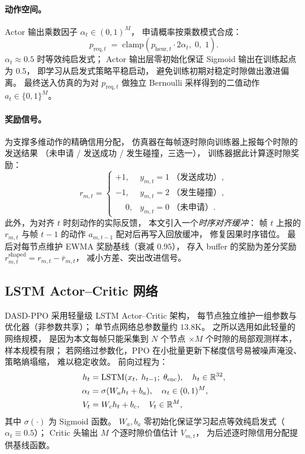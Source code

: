 \paragraph{动作空间。}
Actor 输出乘数因子 \(\alpha_t\in(0,1)^M\)，
申请概率按乘数模式合成：
\begin{equation}
p_{\mathrm{req},t} \;=\; \mathrm{clamp}\!\left( p_{\mathrm{heur},t}\cdot 2\alpha_t,\;0,\;1\right).
\label{eq:multiplier}
\end{equation}
\(\alpha_t\approx 0.5\) 时等效纯启发式；
Actor 输出层零初始化保证 Sigmoid 输出在训练起点为 \(0.5\)，
即学习从启发式策略平稳启动，
避免训练初期对稳定时隙做出激进偏离。
最终送入仿真的为对 \(p_{\mathrm{req},t}\) 做独立 Bernoulli 采样得到的二值动作 \(a_t\in\{0,1\}^M\)。

\paragraph{奖励信号。}
为支撑多维动作的精确信用分配，
仿真器在每帧逐时隙向训练器上报每个时隙的发送结果
（未申请 / 发送成功 / 发生碰撞，三选一），
训练器据此计算逐时隙奖励：
\begin{equation}
r_{m,t} = \begin{cases}
        +1, & y_{m,t}=1\;\text{（发送成功）}, \\
        -1, & y_{m,t}=2\;\text{（发生碰撞）}, \\
        \phantom{+}0, & y_{m,t}=0\;\text{（未申请）}.
\end{cases}
\label{eq:slot-reward}
\end{equation}
此外，为对齐 \(t\) 时刻动作的实际反馈，
本文引入一个\emph{时序对齐缓冲}：
帧 \(t\) 上报的 \(r_{m,t}\) 与帧 \(t-1\) 的动作 \(a_{m,t-1}\) 配对后再写入回放缓冲，
修复因果时序错位。
最后对每节点维护 EWMA 奖励基线（衰减 \(0.95\)），
存入 buffer 的奖励为差分奖励 \(r^{\mathrm{shaped}}_{m,t}=r_{m,t}-\bar r_{m,t}\)，
减小方差、突出改进信号。

\subsection{LSTM Actor--Critic 网络}
\label{subsec:net}

DASD-PPO 采用轻量级 LSTM Actor--Critic 架构，
每节点独立维护一组参数与优化器（非参数共享）；
单节点网络总参数量约 \(13.8\)K。
之所以选用如此轻量的网络规模，
是因为本文每帧只能采集到 \(N\) 个节点 \(\times M\) 个时隙的局部观测样本，
样本规模有限；
若网络过参数化，PPO 在小批量更新下梯度信号易被噪声淹没、
策略熵塌缩，
难以稳定收敛。
前向过程为：
\begin{equation}
    \begin{aligned}
        h_t      &= \mathrm{LSTM}(x_t,\;h_{t-1};\;\theta_{\mathrm{enc}}),\quad h_t\in\mathbb{R}^{32},\\
        \alpha_t &= \sigma(W_a h_t + b_a),\quad \alpha_t\in(0,1)^M,\\
        V_t      &= W_c h_t + b_c,\quad V_t\in\mathbb{R}^M,
    \end{aligned}
    \label{eq:network}
\end{equation}
其中 \(\sigma(\cdot)\) 为 Sigmoid 函数。
\(W_a,b_a\) 零初始化保证学习起点等效纯启发式（\(\alpha_t\equiv 0.5\)）；
Critic 头输出 \(M\) 个逐时隙价值估计 \(V_{m,t}\)，
为后述逐时隙信用分配提供基线函数。

